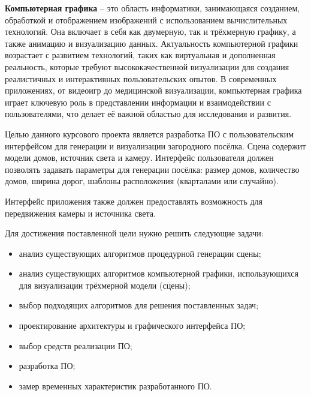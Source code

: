 
\textbf{Компьютерная графика} -- это область информатики, занимающаяся созданием, обработкой и отображением изображений с использованием вычислительных технологий. Она включает в себя как двумерную, так и трёхмерную графику, а также анимацию и визуализацию данных. Актуальность компьютерной графики возрастает с развитием технологий, таких как виртуальная и дополненная реальность, которые требуют высококачественной визуализации для создания реалистичных и интерактивных пользовательских опытов. В современных приложениях, от видеоигр до медицинской визуализации, компьютерная графика играет ключевую роль в представлении информации и взаимодействии с пользователями, что делает её важной областью для исследования и развития.

Целью данного курсового проекта является разработка ПО с пользовательским интерфейсом для генерации и визуализации загородного посёлка. Сцена содержит модели домов, источник света и камеру. Интерфейс пользователя должен позволять задавать параметры для генерации посёлка: размер домов, количество домов, ширина дорог, шаблоны расположения (кварталами или случайно). 

Интерфейс приложения также должен предоставлять возможность для передвижения камеры и источника света.

Для достижения поставленной цели нужно решить следующие задачи:
\begin{itemize}
  \item анализ существующих алгоритмов процедурной генерации сцены;
  \item анализ существующих алгоритмов компьютерной графики, использующихся для визуализации трёхмерной модели (сцены);
  \item выбор подходящих алгоритмов для решения поставленных задач;
  \item проектирование архитектуры и графического интерфейса ПО;
  \item выбор средств реализации ПО;
  \item разработка ПО;
  \item замер временных характеристик разработанного ПО.
\end{itemize}
\clearpage